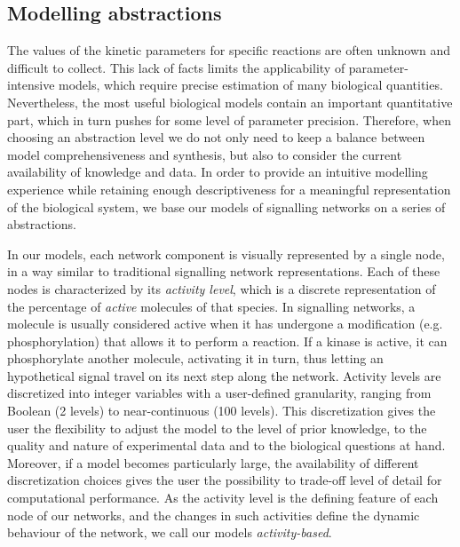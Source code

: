
\subsection{Modelling abstractions}\label{subsec:abstractions}
The values of the kinetic parameters for specific reactions are often unknown and
difficult to collect.
This lack of facts limits the applicability of parameter-intensive models,
which require precise estimation of many biological quantities.
Nevertheless, the most useful biological models contain an important quantitative part, which in turn pushes for some
level of parameter precision.
Therefore, when choosing an abstraction level we do not only need to keep a balance between model comprehensiveness and synthesis,
but also to consider the current availability of knowledge and data. In order to provide an intuitive modelling
experience while retaining enough descriptiveness for a meaningful representation of the biological system, we base
our models of signalling networks on a series of abstractions.

In our models, each network component is visually represented by a single node, in a way similar to traditional
signalling network representations.
Each of these nodes is characterized by its \emph{activity level}, which
is a discrete representation of the percentage of \emph{active} molecules of that species. In signalling networks,
a molecule is usually considered active when it has undergone a modification (e.g. phosphorylation) that
allows it to perform a reaction. If a kinase is active, it can phosphorylate another molecule, activating it
in turn, thus letting an hypothetical signal travel on its next step along the network. Activity levels are discretized
into integer variables with a user-defined granularity, ranging from Boolean (2 levels) to near-continuous (100 levels).
This discretization gives the user the flexibility to adjust the model to the level of prior knowledge,
to the quality and nature of experimental data and to the biological questions at hand. Moreover, if a model
becomes particularly large, the availability of different discretization choices gives the user
the possibility to trade-off level of detail for computational performance. As the activity level is the
defining feature of each node of our networks, and the changes in such activities define the
dynamic behaviour of the network, we call our models \emph{activity-based}.

